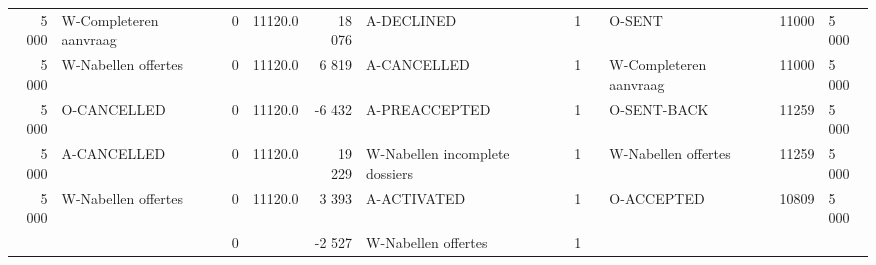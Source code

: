 \begin{tabular}{rlrlrlrllll}
5 000 & W-Completeren aanvraag & 0 & 11120.0 & 18 076 & A-DECLINED & 1 &  & O-SENT & 11000 & 5 000 \\
5 000 & W-Nabellen offertes & 0 & 11120.0 & 6 819 & A-CANCELLED & 1 &  & W-Completeren aanvraag & 11000 & 5 000 \\
5 000 & O-CANCELLED & 0 & 11120.0 & -6 432 & A-PREACCEPTED & 1 &  & O-SENT-BACK & 11259 & 5 000 \\
5 000 & A-CANCELLED & 0 & 11120.0 & 19 229 & W-Nabellen incomplete dossiers & 1 &  & W-Nabellen offertes & 11259 & 5 000 \\
5 000 & W-Nabellen offertes & 0 & 11120.0 & 3 393 & A-ACTIVATED & 1 &  & O-ACCEPTED & 10809 & 5 000 \\
 &  & 0 &  & -2 527 & W-Nabellen offertes & 1 &  &  &  &  \\
\bottomrule
\end{tabular}
